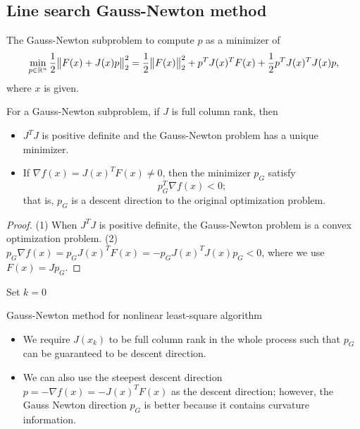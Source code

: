 \begin{refsection}
\subsection{Line search Gauss-Newton method}

\begin{definition}
The Gauss-Newton subproblem to compute $p$ as a minimizer of
$$\min_{p\in \mathbb{R}^n} \frac{1}{2}\norm{F(x) + J(x)p}_2^2 = \frac{1}{2}\norm{F(x)}^2_2 + p^TJ(x)^TF(x) + \frac{1}{2}p^TJ(x)^TJ(x)p,$$
where $x$ is given.
\end{definition}

\begin{lemma}
For a Gauss-Newton subproblem, if $J$ is full column rank, then
\begin{itemize}
	\item $J^TJ$ is positive definite and the Gauss-Newton problem has a unique minimizer.
	\item If $\nabla f(x)=J(x)^TF(x)\neq 0$, then the minimizer $p_G$ satisfy $$p_G^T \nabla f(x) < 0;$$
	that is, $p_G$ is a descent direction to the original optimization problem.
\end{itemize}
\end{lemma}
\begin{proof}
(1) When $J^TJ$ is positive definite, the Gauss-Newton problem is a convex optimization problem.
(2) $p_G\nabla f(x) = p_G J(x)^TF(x) = -p_GJ(x)^TJ(x)p_G < 0 $, where we use $F(x) = Jp_G$.
\end{proof}





\begin{algorithm}[H]
	\SetAlgoLined
	Set $k = 0$
	\caption{Gauss-Newton method for nonlinear least-square algorithm}
\end{algorithm}

\begin{remark}[interpretation]\hfill
	\begin{itemize}
		\item We require $J(x_k)$ to be full column rank in the whole process such that $p_G$ can be guaranteed to be descent direction. 
		\item We can also use the steepest descent direction $p =-\nabla f(x) = -J(x)^TF(x)$ as the descent direction; however, the Gauss Newton direction $p_G$ is better because it contains curvature information.
	\end{itemize}	
\end{remark}




\end{refsection}
